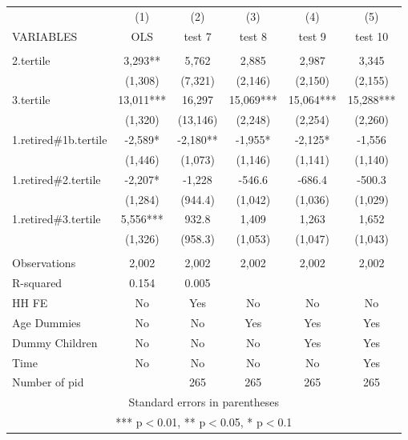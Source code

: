\begin{tabular}{lccccc} \hline
 & (1) & (2) & (3) & (4) & (5) \\
VARIABLES & OLS & test 7 & test 8 & test 9 & test 10 \\ \hline
 &  &  &  &  &  \\
2.tertile & 3,293** & 5,762 & 2,885 & 2,987 & 3,345 \\
 & (1,308) & (7,321) & (2,146) & (2,150) & (2,155) \\
3.tertile & 13,011*** & 16,297 & 15,069*** & 15,064*** & 15,288*** \\
 & (1,320) & (13,146) & (2,248) & (2,254) & (2,260) \\
1.retired\#1b.tertile & -2,589* & -2,180** & -1,955* & -2,125* & -1,556 \\
 & (1,446) & (1,073) & (1,146) & (1,141) & (1,140) \\
1.retired\#2.tertile & -2,207* & -1,228 & -546.6 & -686.4 & -500.3 \\
 & (1,284) & (944.4) & (1,042) & (1,036) & (1,029) \\
1.retired\#3.tertile & 5,556*** & 932.8 & 1,409 & 1,263 & 1,652 \\
 & (1,326) & (958.3) & (1,053) & (1,047) & (1,043) \\
 &  &  &  &  &  \\
Observations & 2,002 & 2,002 & 2,002 & 2,002 & 2,002 \\
R-squared & 0.154 & 0.005 &  &  &  \\
HH FE & No & Yes & No & No & No \\
Age Dummies & No & No & Yes & Yes & Yes \\
Dummy Children & No & No & No & Yes & Yes \\
Time & No & No & No & No & Yes \\
 Number of pid &  & 265 & 265 & 265 & 265 \\ \hline
\multicolumn{6}{c}{ Standard errors in parentheses} \\
\multicolumn{6}{c}{ *** p$<$0.01, ** p$<$0.05, * p$<$0.1} \\
\end{tabular}
